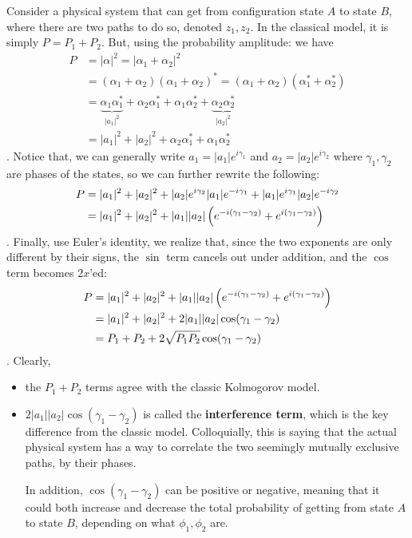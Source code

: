 \documentclass[12pt]{article}
\begin{document}
\begin{example}\label{eg:prob-amp}
Consider a physical system that can get from configuration state $A$ to state $B$, where there are two paths to do so, denoted $z_1, z_2$. In the classical model, it is simply $P = P_1 + P_2$. But, using the probability amplitude: we have $$
\begin{aligned}
P
    &= |\alpha|^2 = |\alpha_1 + \alpha_2|^2 \\
    &= (\alpha_1 + \alpha_2)(\alpha_1 + \alpha_2)^* = (\alpha_1 + \alpha_2)(\alpha_1^* + \alpha_2^*)\\
    &= \underset{|a_1|^2}{\underbrace{\alpha_1\alpha_1^*}} + \alpha_2\alpha_1^* + \alpha_1\alpha_2^* + \underset{|a_2|^2}{\underbrace{\alpha_2\alpha_2^*}}\\
    &= |a_1|^2 + |a_2|^2 + \alpha_2\alpha_1^* + \alpha_1\alpha_2^*
\end{aligned}
$$. Notice that, we can generally write $a_1 = |a_1|e^{i\gamma_1}$ and $a_2 = |a_2|e^{i\gamma_2}$ where $\gamma_1, \gamma_2$ are phases of the states, so we can further rewrite the following: $$
\begin{aligned}
P
    &= |a_1|^2 + |a_2|^2 + |a_2|e^{i\gamma_2}|a_1|e^{-i\gamma_1} + |a_1|e^{i\gamma_1}|a_2|e^{-i\gamma_2} \\
    &= |a_1|^2 + |a_2|^2 + |a_1||a_2|\left(e^{-i(\gamma_1-\gamma_2)} + e^{i(\gamma_1-\gamma_2)}\right) \\
\end{aligned}
$$. Finally, use Euler's identity, we realize that, since the two exponents are only different by their signs, the $\sin$ term cancels out under addition, and the $\cos$ term becomes $2x$'ed: $$
\begin{aligned}
P
    &= |a_1|^2 + |a_2|^2 + |a_1||a_2|\left(e^{-i(\gamma_1-\gamma_2)} + e^{i(\gamma_1-\gamma_2)}\right) \\
    &= |a_1|^2 + |a_2|^2 + 2|a_1||a_2|\cos(\gamma_1-\gamma_2) \\
    &= P_1 + P_2 + 2\sqrt{P_1P_2}\cos(\gamma_1-\gamma_2)
\end{aligned}
$$. Clearly,
\begin{itemize}
    \item the $P_1 + P_2$ terms agree with the classic Kolmogorov model.
    \item $2|a_1||a_2|\cos(\gamma_1-\gamma_2)$ is called the \textbf{interference term}, which is the key difference from the classic model. Colloquially, this is saying that the actual physical system has a way to correlate the two seemingly mutually exclusive paths, by their phases.

    In addition, $\cos(\gamma_1-\gamma_2)$ can be positive or negative, meaning that it could both increase and decrease the total probability of getting from state $A$ to state $B$, depending on what $\phi_1, \phi_2$ are.  
\end{itemize}
\end{example}
\end{document}

